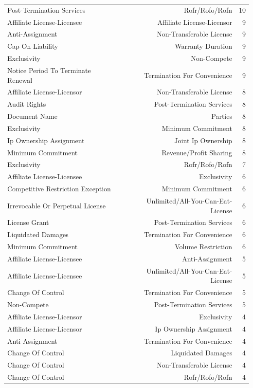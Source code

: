 \begin{tabular}{lrr}
Post-Termination Services & Rofr/Rofo/Rofn & 10 \\
Affiliate License-Licensee & Affiliate License-Licensor & 9 \\
Anti-Assignment & Non-Transferable License & 9 \\
Cap On Liability & Warranty Duration & 9 \\
Exclusivity & Non-Compete & 9 \\
Notice Period To Terminate Renewal & Termination For Convenience & 9 \\
Affiliate License-Licensor & Non-Transferable License & 8 \\
Audit Rights & Post-Termination Services & 8 \\
Document Name & Parties & 8 \\
Exclusivity & Minimum Commitment & 8 \\
Ip Ownership Assignment & Joint Ip Ownership & 8 \\
Minimum Commitment & Revenue/Profit Sharing & 8 \\
Exclusivity & Rofr/Rofo/Rofn & 7 \\
Affiliate License-Licensee & Exclusivity & 6 \\
Competitive Restriction Exception & Minimum Commitment & 6 \\
Irrevocable Or Perpetual License & Unlimited/All-You-Can-Eat-License & 6 \\
License Grant & Post-Termination Services & 6 \\
Liquidated Damages & Termination For Convenience & 6 \\
Minimum Commitment & Volume Restriction & 6 \\
Affiliate License-Licensee & Anti-Assignment & 5 \\
Affiliate License-Licensee & Unlimited/All-You-Can-Eat-License & 5 \\
Change Of Control & Termination For Convenience & 5 \\
Non-Compete & Post-Termination Services & 5 \\
Affiliate License-Licensor & Exclusivity & 4 \\
Affiliate License-Licensor & Ip Ownership Assignment & 4 \\
Anti-Assignment & Termination For Convenience & 4 \\
Change Of Control & Liquidated Damages & 4 \\
Change Of Control & Non-Transferable License & 4 \\
Change Of Control & Rofr/Rofo/Rofn & 4 \\

\end{tabular}
